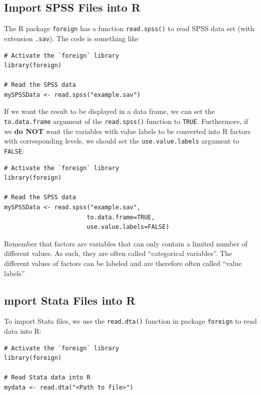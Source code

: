 \documentclass[
]{book}
\begin{document}
\hypertarget{import-spss-files-into-r}{%
\subsection{Import SPSS Files into R}\label{import-spss-files-into-r}}

The R package \texttt{foreign} has a function \texttt{read.spss()} to read SPSS data set (with extension \texttt{.sav}). The code is something like

\begin{verbatim}
# Activate the `foreign` library
library(foreign)

# Read the SPSS data
mySPSSData <- read.spss("example.sav")
\end{verbatim}

If we want the result to be displayed in a data frame, we can set the \texttt{to.data.frame} argument of the \texttt{read.spss()} function to \texttt{TRUE}. Furthermore, if we \textbf{do NOT} want the variables with value labels to be converted into R factors with corresponding levels, we should set the \texttt{use.value.labels} argument to \texttt{FALSE}:

\begin{verbatim}
# Activate the `foreign` library
library(foreign)

# Read the SPSS data
mySPSSData <- read.spss("example.sav",
                       to.data.frame=TRUE,
                       use.value.labels=FALSE)
\end{verbatim}

Remember that factors are variables that can only contain a limited number of different values. As such, they are often called ``categorical variables''. The different values of factors can be labeled and are therefore often called ``value labels''

\hypertarget{mport-stata-files-into-r}{%
\subsection{mport Stata Files into R}\label{mport-stata-files-into-r}}

To import Stata files, we use the \texttt{read.dta()} function in package \texttt{foreign} to read data into R:

\begin{verbatim}
# Activate the `foreign` library
library(foreign)

# Read Stata data into R
mydata <- read.dta("<Path to file>") 
\end{verbatim}
\end{document}
